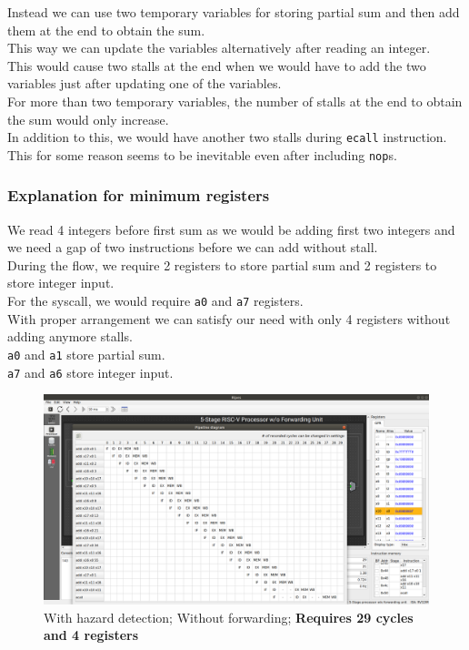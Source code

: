 \documentclass[12pt, fleqn]{article}
\begin{document}
Instead we can use two temporary variables for storing partial sum and then add them at the end to obtain the sum. \\
This way we can update the variables alternatively after reading an integer. \\
This would cause two stalls at the end when we would have to add the two variables just after updating one of the variables. \\

For more than two temporary variables, the number of stalls at the end to obtain the sum would only increase. \\

In addition to this, we would have another two stalls during \verb!ecall! instruction. \\
This for some reason seems to be inevitable even after including \verb!nop!s.

\subsubsection*{Explanation for minimum registers}
We read 4 integers before first sum as we would be adding first two integers and we need a gap of two instructions before we can add without stall. \\
During the flow, we require 2 registers to store partial sum and 2 registers to store integer input. \\
For the syscall, we would require \verb!a0! and \verb!a7! registers. \\
With proper arrangement we can satisfy our need with only 4 registers without adding anymore stalls. \\
\verb!a0! and \verb!a1! store partial sum. \\
\verb!a7! and \verb!a6! store integer input. \\

\begin{figure}[H]
  \centering
  \includegraphics[scale=0.22]{Q4/hnf_pipeline.png}
  \caption{With hazard detection; Without forwarding; \textbf{Requires 29 cycles and 4 registers}}
\end{figure}
\end{document}
